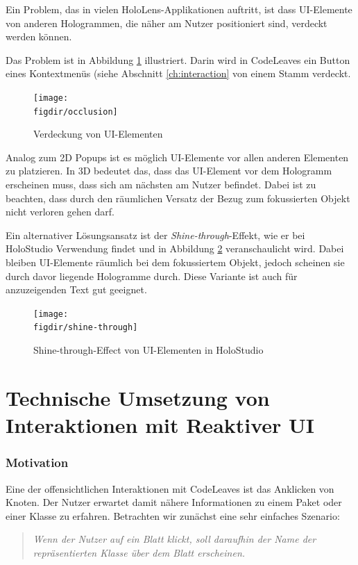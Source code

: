 Ein Problem, das in vielen HoloLens-Applikationen auftritt, ist dass UI-Elemente von anderen Hologrammen, die näher am Nutzer positioniert sind, verdeckt werden können.

Das Problem ist in Abbildung \ref{fig:occlusion} illustriert. Darin wird in CodeLeaves ein Button eines Kontextmenüs (siehe Abschnitt \ref{ch:interaction} von einem Stamm verdeckt.

\begin{figure}[htb]
  \texttt{[image: \\figdir/occlusion]}
  \caption{Verdeckung von UI-Elementen}
  \label{fig:occlusion}
\end{figure}

Analog zum 2D Popups ist es möglich UI-Elemente vor allen anderen Elementen zu platzieren. In 3D bedeutet das, dass das UI-Element vor dem Hologramm erscheinen muss, dass sich am nächsten am Nutzer befindet. Dabei ist zu beachten, dass durch den räumlichen Versatz der Bezug zum fokussierten Objekt nicht verloren gehen darf.

Ein alternativer Lösungsansatz ist der \textit{Shine-through}-Effekt, wie er bei HoloStudio Verwendung findet und in Abbildung \ref{fig:shine-through} veranschaulicht wird. Dabei bleiben UI-Elemente räumlich bei dem fokussiertem Objekt, jedoch scheinen sie durch davor liegende Hologramme durch. Diese Variante ist auch für anzuzeigenden Text gut geeignet.

\begin{figure}[htb]
  \texttt{[image: \\figdir/shine-through]}
  \caption{Shine-through-Effect von UI-Elementen in HoloStudio \cite{windows2017casestudy3}}
  \label{fig:shine-through}
\end{figure}

\section{Technische Umsetzung von Interaktionen mit Reaktiver UI}

\subsubsection*{Motivation}
Eine der offensichtlichen Interaktionen mit CodeLeaves ist das Anklicken von Knoten. Der Nutzer erwartet damit nähere Informationen zu einem Paket oder einer Klasse zu erfahren. Betrachten wir zunächst eine sehr einfaches Szenario:

\begin{quotation}
  \textit{Wenn der Nutzer auf ein Blatt klickt, soll daraufhin der Name der repräsentierten Klasse über dem Blatt erscheinen.}
\end{quotation}

